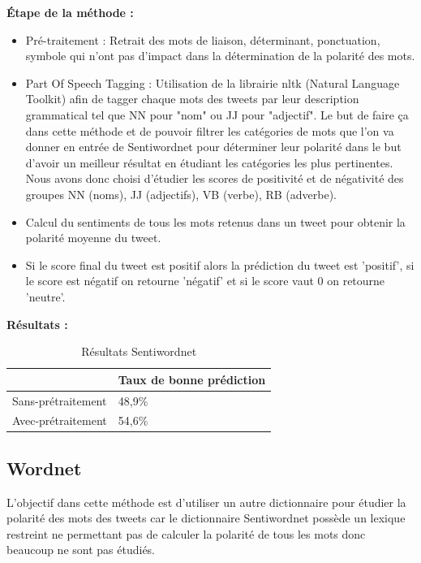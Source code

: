 \par \textbf{Étape de la méthode :}
\begin{itemize}
	\item Pré-traitement : Retrait des mots de liaison, déterminant, ponctuation, symbole qui n'ont pas d'impact dans la détermination de la polarité des mots.	
	\item Part Of Speech Tagging : Utilisation de la librairie nltk (Natural Language Toolkit) afin de tagger chaque mots des tweets par leur description grammatical tel que NN pour "nom" ou JJ pour "adjectif". Le but de faire ça dans cette méthode et de pouvoir filtrer les catégories de mots que l'on va donner en entrée de Sentiwordnet pour déterminer leur polarité dans le but d'avoir un meilleur résultat en étudiant les catégories les plus pertinentes. Nous avons donc choisi d'étudier les scores de positivité et de négativité des groupes NN (noms), JJ (adjectifs), VB (verbe), RB (adverbe).
	\item Calcul du sentiments de tous les mots retenus dans un tweet pour obtenir la polarité moyenne du tweet. 
	\item Si le score final du tweet est positif alors la prédiction du tweet est 'positif', si le score est négatif on retourne 'négatif' et si le score vaut 0 on retourne 'neutre'. \\
\end{itemize}

\par \textbf{Résultats :} 

\begin{table}[h!]
\centering
\caption{Résultats Sentiwordnet}
\label{my-label}
\begin{tabular}{|l|l|}
\hline
                   & Taux de bonne prédiction \\ \hline
Sans-prétraitement & 48,9\%                   \\ \hline
Avec-prétraitement & 54,6\%                   \\ \hline
\end{tabular}
\end{table}



\subsection{Wordnet}

\par L'objectif dans cette méthode est d'utiliser un autre dictionnaire pour étudier la polarité des mots des tweets car le dictionnaire Sentiwordnet possède un lexique restreint ne permettant pas de calculer la polarité de tous les mots donc beaucoup ne sont pas étudiés. \\

